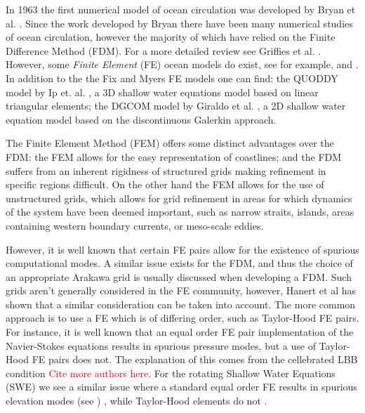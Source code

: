 In 1963 the first numerical model of ocean circulation was developed by Bryan et
al.  \cite{Bryan1963}. Since the work developed by Bryan there have been many
numerical studies of ocean circulation, however the majority of which have
relied on the Finite Difference Method (FDM). For a more detailed review see
Griffies et al. \cite{Griffies2000}. However, some \emph{Finite Element} (FE)
ocean models do exist, see for example, \cite{Fix} and \cite{Myers}. In addition
to the the Fix and Myers FE models one can find: the QUODDY model by Ip et. al.
\cite{Ip1995}, a 3D shallow water equations model based on linear triangular
elements; the DGCOM model by Giraldo et al. \cite{GiraldoWWW}, a 2D shallow
water equation model based on the discontinuous Galerkin approach.

The Finite Element Method (FEM) offers some distinct advantages over the FDM:
the FEM allows for the easy representation of coastlines; and the FDM suffers
from an inherent rigidness of structured grids making refinement in specific
regions difficult. On the other hand the FEM allows for the use of unstructured
grids, which allows for grid refinement in areas for which dynamics of the
system have been deemed important, such as narrow straits, islands, areas
containing western boundary currents, or meso-scale eddies.

However, it is well known that certain FE pairs allow for the existence of
spurious computational modes. A similar issue exists for the FDM, and thus the
choice of an appropriate Arakawa grid is usually discussed when developing a
FDM. Such grids aren't generally considered in the FE community, however, Hanert
et al \cite{Hanert2002} has shown that a similar consideration can be taken into
account. The more common approach is to use a FE which is of differing order,
such as Taylor-Hood FE pairs. For instance, it is well known that an equal order
FE pair implementation of the Navier-Stokes equations results in spurious
pressure modes, but a use of Taylor-Hood FE pairs does not. The explanation of
this comes from the cellebrated LBB condition \cite{Johnson2009}
\textcolor{red}{Cite more authors here}. For the rotating Shallow Water
Equations (SWE) we see a similar issue where a standard equal order FE results
in spurious elevation modes (see \cite{Hanert2002,Hanert2006,Le-Roux2005}) ,
while Taylor-Hood elements do not \cite{Hanert2004}. 

